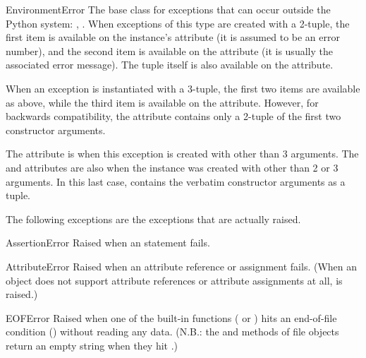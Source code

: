 \begin{excdesc}{EnvironmentError}
The base class for exceptions that
can occur outside the Python system: ,
.  When exceptions of this type are created with a
2-tuple, the first item is available on the instance's 
attribute (it is assumed to be an error number), and the second item
is available on the  attribute (it is usually the
associated error message).  The tuple itself is also available on the
 attribute.

When an  exception is instantiated with a
3-tuple, the first two items are available as above, while the third
item is available on the  attribute.  However, for
backwards compatibility, the  attribute contains only a
2-tuple of the first two constructor arguments.

The  attribute is  when this exception is
created with other than 3 arguments.  The  and
 attributes are also  when the instance was
created with other than 2 or 3 arguments.  In this last case,
 contains the verbatim constructor arguments as a tuple.
\end{excdesc}



The following exceptions are the exceptions that are actually raised.

\begin{excdesc}{AssertionError}
Raised when an  statement fails.
\end{excdesc}

\begin{excdesc}{AttributeError}
  Raised when an attribute reference or assignment fails.  (When an
  object does not support attribute references or attribute assignments
  at all,  is raised.)
\end{excdesc}

\begin{excdesc}{EOFError}
  Raised when one of the built-in functions ( or
  ) hits an end-of-file condition (\EOF{}) without
  reading any data.
  (N.B.: the  and  methods of file
  objects return an empty string when they hit \EOF{}.)
\end{excdesc}

